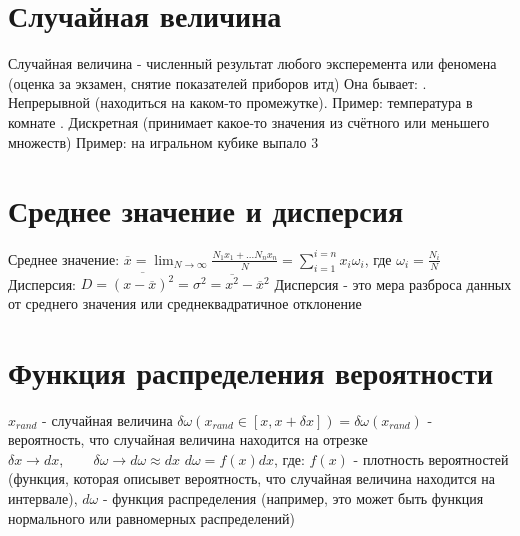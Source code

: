 \documentclass[a4paper]{article}
\begin{document}
	
	\section*{Случайная величина}
	\begin{flushleft}
		Случайная величина - численный результат любого эксперемента или феномена (оценка за экзамен, снятие показателей приборов итд) \linebreak
		Она бывает: . Непрерывной (находиться на каком-то промежутке). Пример: температура в комнате . Дискретная (принимает какое-то значения из счётного или меньшего множеств) Пример: на игральном кубике выпало 3   
	\end{flushleft}
	\section*{Среднее значение и дисперсия}
	\begin{flushleft}
		Среднее значение: $\overline{x} = \lim_{N \rightarrow \infty} \frac{N_1 x_1 + ... N_n x_n}{N}=  \sum_{i=1}^{i=n}x_i \omega_i$, где $\omega_i = \frac{N_i}{N}$  \linebreak
		Дисперсия: $D = \overline{(x - \overline{x}) ^ 2} = \sigma ^ 2 = \overline{x^2} - \overline{x} ^ 2 $ \linebreak
		Дисперсия - это мера разброса данных от среднего значения или среднеквадратичное отклонение
	\end{flushleft}
	\section*{Функция распределения вероятности}
	\begin{flushleft}
		$x_{rand}$ - случайная величина \linebreak
		$\delta\omega(x_{rand} \in [x, x+ \delta x]) = \delta \omega (x_{rand})$ - вероятность, что случайная величина находится на отрезке
		\linebreak
		$\delta x \rightarrow dx, \qquad \delta \omega \rightarrow d \omega \approx dx$ \linebreak
		$d \omega = f(x) dx $, где: \linebreak
		 $f(x)$ - плотность вероятностей (функция, которая описывет вероятность, что случайная величина находится на интервале), \linebreak $d \omega $ - функция распределения (например, это может быть функция нормального или равномерных распределений)
	\end{flushleft}
	
\end{document}
